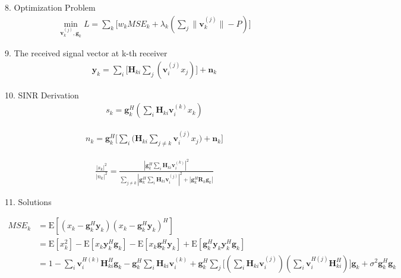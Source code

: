 \documentclass[11pt, oneside]{article}   	%
\begin{document}
8. Optimization Problem
\begin{align*}
\min_{\textbf{v}_{k}^{(j)} ,\textbf{g}_{k}} L =\displaystyle\sum_{k} 	\bigg[w_k	MSE_{k}	+	\lambda_{k}	(\displaystyle\sum_{j}	\|	\textbf{v}^{(j)}_{k}	\|	-P	)	\bigg]
\end{align*}

9. The received signal vector at k-th receiver
\begin{align*}
\textbf{y}_{k}  = \displaystyle\sum_{i}		\bigg[	\textbf{H}_{ki}	\displaystyle\sum_{j}	(\textbf{v}^{(j)}_{i}	x_j)		\bigg]	+\textbf{n}_{k}
\end{align*}


10. SINR Derivation
\begin{align*}
s_{k} = \textbf{g}^{H}_{k}
		(\displaystyle\sum_{i}
		\textbf{H}_{ki} 
		\textbf{v}^{(k)}_{i}x_k)
\end{align*}



\begin{align*}
n_{k} = \textbf{g}^{H}_{k}
		\bigg[\displaystyle\sum_{i}
		\big(	\textbf{H}_{ki} 
		\displaystyle\sum_{j \neq k}	\textbf{v}^{(j)}_{i}x_j	\big)
		+\textbf{n}_{k}\bigg]
\end{align*}

\begin{align*}
\frac	{	|s_{k}|^2	}{	|n_{k}|^2	} = 
\frac {	|\textbf{g}^{H}_{k}
		\displaystyle\sum_{i}
		\textbf{H}_{ki} 
		\textbf{v}^{(k)}_{i}|^2	
	} 
	{	\displaystyle\sum_{j \neq k}
		|\textbf{g}^{H}_{k}
		\displaystyle\sum_{i}
		\textbf{H}_{ki} 
		\textbf{v}^{(j)}_{i}|^2
		+|\textbf{g}^{H}_{k}
		\textbf{R}_{k}
		\textbf{g}_{k}|
	}
\end{align*}




11. Solutions

\begin{align*}
MSE_{k} &= \mathrm{E}	[	(	x_k-\textbf{g}^{H}_{k}	\textbf{y}_{k}	)(x_k-\textbf{g}^{H}_{k}	\textbf{y}_{k})^{H}	] \\
		       & = \mathrm{E}[x_k^{2}]	 - \mathrm{E}[x_k	\textbf{y}_{k}^{H} \textbf{g}_{k}]	
		       					-  \mathrm{E}[x_k	\textbf{g}_{k}^{H} \textbf{y}_{k}]
							+ \mathrm{E}[\textbf{g}_{k}^{H} \textbf{y}_{k}	\textbf{y}_{k}^{H} \textbf{g}_{k}]			\\
		       & = 1 - \displaystyle\sum_{i}	\textbf{v}^{H(k)}_{i}	\textbf{H}^{H}_{ki}	\textbf{g}_{k}
		       		- \textbf{g}^{H}_{k}		\displaystyle\sum_{i}	\textbf{H}_{ki}	\textbf{v}^{(k)}_{i}
				+\textbf{g}^{H}_{k}		\displaystyle\sum_{j}
									\bigg[	(\displaystyle\sum_{i}\textbf{H}_{ki}\textbf{v}^{(j)}_{i})
									(\displaystyle\sum_{i}\textbf{v}^{H(j)}_{i}\textbf{H}^{H}_{ki})	\bigg]	\textbf{g}_{k}
				+\sigma^2		\textbf{g}^{H}_{k}	 \textbf{g}_{k}
\end{align*}
\end{document}
